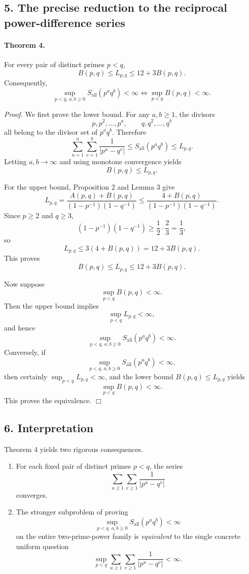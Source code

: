 \subsection*{5. The precise reduction to the reciprocal power-difference series}

\paragraph{Theorem 4.}
For every pair of distinct primes \(p<q\),
\[
B(p,q)\le L_{p,q}\le 12+3B(p,q).
\]
Consequently,
\[
\sup_{p<q,\,a,b\ge 0}S_{\mathrm{all}}(p^a q^b)<\infty
\iff
\sup_{p<q}B(p,q)<\infty.
\]

\emph{Proof.}
We first prove the lower bound. For any \(a,b\ge 1\), the divisors
\[
p,p^2,\dots,p^a,\qquad q,q^2,\dots,q^b
\]
all belong to the divisor set of \(p^a q^b\). Therefore
\[
\sum_{u=1}^{a}\sum_{v=1}^{b}\frac{1}{|p^u-q^v|}
\le S_{\mathrm{all}}(p^a q^b)
\le L_{p,q}.
\]
Letting \(a,b\to\infty\) and using monotone convergence yields
\[
B(p,q)\le L_{p,q}.
\]

For the upper bound, Proposition 2 and Lemma 3 give
\[
L_{p,q}
=
\frac{A(p,q)+B(p,q)}{(1-p^{-1})(1-q^{-1})}
\le
\frac{4+B(p,q)}{(1-p^{-1})(1-q^{-1})}.
\]
Since \(p\ge 2\) and \(q\ge 3\),
\[
(1-p^{-1})(1-q^{-1})\ge \frac12\cdot \frac23 = \frac13,
\]
so
\[
L_{p,q}\le 3(4+B(p,q))=12+3B(p,q).
\]
This proves
\[
B(p,q)\le L_{p,q}\le 12+3B(p,q).
\]

Now suppose
\[
\sup_{p<q} B(p,q)<\infty.
\]
Then the upper bound implies
\[
\sup_{p<q}L_{p,q}<\infty,
\]
and hence
\[
\sup_{p<q,\,a,b\ge 0}S_{\mathrm{all}}(p^a q^b)<\infty.
\]
Conversely, if
\[
\sup_{p<q,\,a,b\ge 0}S_{\mathrm{all}}(p^a q^b)<\infty,
\]
then certainly \(\sup_{p<q}L_{p,q}<\infty\), and the lower bound \(B(p,q)\le L_{p,q}\) yields
\[
\sup_{p<q}B(p,q)<\infty.
\]
This proves the equivalence.
\hfill\(\Box\)

\subsection*{6. Interpretation}

Theorem 4 yields two rigorous consequences.

\begin{enumerate}
\item For each fixed pair of distinct primes \(p<q\), the series
\[
\sum_{u\ge 1}\sum_{v\ge 1}\frac{1}{|p^u-q^v|}
\]
converges.
\item The stronger subproblem of proving
\[
\sup_{p<q,\,a,b\ge 0}S_{\mathrm{all}}(p^a q^b)<\infty
\]
on the entire two-prime-power family is \emph{equivalent} to the single concrete uniform question
\[
\sup_{p<q}\sum_{u\ge 1}\sum_{v\ge 1}\frac{1}{|p^u-q^v|}<\infty.
\]
\end{enumerate}

